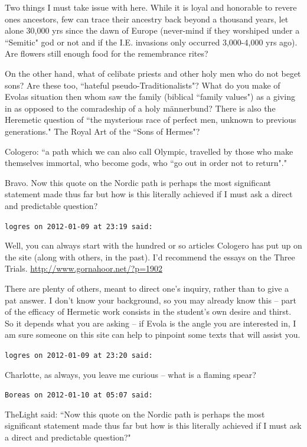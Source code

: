 \begin{footnotesize}
\begin{sffamily}
Two things I must take issue with here. While it is loyal and honorable to revere ones ancestors, few can trace their ancestry back beyond a thousand years, let alone 30,000 yrs since the dawn of Europe (never-mind if they worshiped under a ``Semitic" god or not and if the I.E. invasions only occurred 3,000-4,000 yrs ago). Are flowers still enough food for the remembrance rites? 

On the other hand, what of celibate priests and other holy men who do not beget sons? Are these too, ``hateful pseudo-Traditionalists"? What do you make of Evolas situation then whom saw the family (biblical ``family values") as a giving in as opposed to the comradeship of a holy männerbund? There is also the Heremetic question of ``the mysterious race of perfect men, unknown to previous generations." The Royal Art of the ``Sons of Hermes"? 

Cologero: ``a path which we can also call Olympic, travelled by those who make themselves immortal, who become gods, who ``go out in order not to return"." 

Bravo. Now this quote on the Nordic path is perhaps the most significant statement made thus far but how is this literally achieved if I must ask a direct and predictable question?


\hfill

\texttt{logres on 2012-01-09 at 23:19 said: }

Well, you can always start with the hundred or so articles Cologero has put up on the site (along with others, in the past). I'd recommend the essays on the Three Trials. \url{http://www.gornahoor.net/?p=1902}

There are plenty of others, meant to direct one's inquiry, rather than to give a pat answer. I don't know your background, so you may already know this – part of the efficacy of Hermetic work consists in the student's own desire and thirst. So it depends what you are asking – if Evola is the angle you are interested in, I am sure someone on this site can help to pinpoint some texts that will assist you.


\hfill

\texttt{logres on 2012-01-09 at 23:20 said: }

Charlotte, as always, you leave me curious – what is a flaming spear?


\hfill

\texttt{Boreas on 2012-01-10 at 05:07 said: }

TheLight said: ``Now this quote on the Nordic path is perhaps the most significant statement made thus far but how is this literally achieved if I must ask a direct and predictable question?"


\end{sffamily}
\end{footnotesize}
